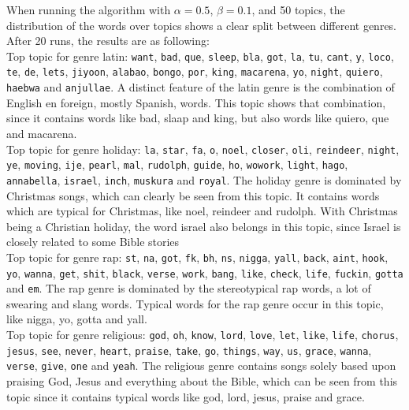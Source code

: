 When running the algorithm with $\alpha = 0.5$, $\beta = 0.1$, and 50 topics, the distribution of the words over topics shows a clear split between different genres. After 20 runs, the results are as following: \\
Top topic for genre latin: \verb|want|, \verb|bad|, \verb|que|, \verb|sleep|, \verb|bla|, \verb|got|, \verb|la|, \verb|tu|, \verb|cant|, \verb|y|, \verb|loco|, \verb|te|, \verb|de|, \verb|lets|, \verb|jiyoon|, \verb|alabao|, \verb|bongo|, \verb|por|, \verb|king|, \verb|macarena|, \verb|yo|, \verb|night|, \verb|quiero|, \verb|haebwa| and \verb|anjullae|. A distinct feature of the latin genre is the combination of English en foreign, mostly Spanish, words. This topic shows that combination, since it contains words like bad, slaap and king, but also words like quiero, que and macarena. \\
Top topic for genre holiday: \verb|la|, \verb|star|, \verb|fa|, \verb|o|, \verb|noel|, \verb|closer|, \verb|oli|, \verb|reindeer|, \verb|night|, \verb|ye|, \verb|moving|, \verb|ije|, \verb|pearl|, \verb|mal|, \verb|rudolph|, \verb|guide|, \verb|ho|, \verb|wowork|, \verb|light|, \verb|hago|, \verb|annabella|, \verb|israel|, \verb|inch|, \verb|muskura| and \verb|royal|. The holiday genre is dominated by Christmas songs, which can clearly be seen from this topic. It contains words which are typical for Christmas, like noel, reindeer and rudolph. With Christmas being a Christian holiday, the word israel also belongs in this topic, since Israel is closely related to some Bible stories \\
Top topic for genre rap: \verb|st|, \verb|na|, \verb|got|, \verb|fk|, \verb|bh|, \verb|ns|, \verb|nigga|, \verb|yall|, \verb|back|, \verb|aint|, \verb|hook|, \verb|yo|, \verb|wanna|, \verb|get|, \verb|shit|, \verb|black|, \verb|verse|, \verb|work|, \verb|bang|, \verb|like|, \verb|check|, \verb|life|, \verb|fuckin|, \verb|gotta| and \verb|em|. The rap genre is dominated by the stereotypical rap words, a lot of swearing and slang words. Typical words for the rap genre occur in this topic, like nigga, yo, gotta and yall. \\
Top topic for genre religious: \verb|god|, \verb|oh|, \verb|know|, \verb|lord|, \verb|love|, \verb|let|, \verb|like|, \verb|life|, \verb|chorus|, \verb|jesus|, \verb|see|, \verb|never|, \verb|heart|, \verb|praise|, \verb|take|, \verb|go|, \verb|things|, \verb|way|, \verb|us|, \verb|grace|, \verb|wanna|, \verb|verse|, \verb|give|, \verb|one| and \verb|yeah|. The religious genre contains songs solely based upon praising God, Jesus and everything about the Bible, which can be seen from this topic since it contains typical words like god, lord, jesus, praise and grace. \\
